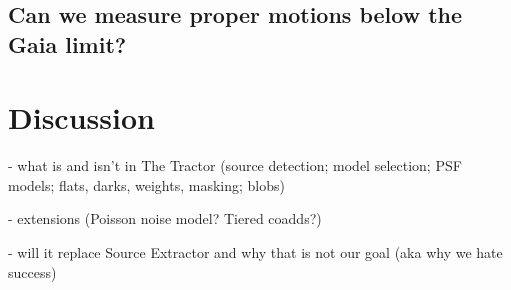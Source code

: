 \documentclass[linenumbers]{aastex631}
\begin{document}
\subsection{Can we measure proper motions below the Gaia limit?}



\section{Discussion}

- what is and isn't in The Tractor (source detection; model selection; PSF models; flats, darks, weights, masking; blobs)

- extensions (Poisson noise model?  Tiered coadds?)

- will it replace Source Extractor and why that is not our goal (aka why we hate success)



\software{%
          }


{}

\end{document}
